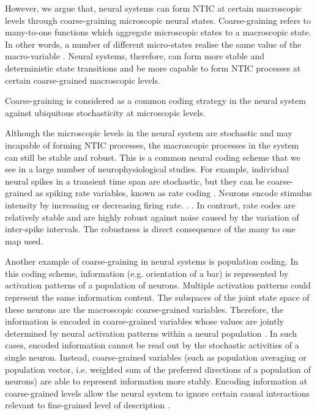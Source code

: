 \documentclass[utf8]{article}
\begin{document}

		However, we argue that, neural systems can form NTIC at certain macroscopic levels through coarse-graining microscopic neural states. Coarse-graining refers to many-to-one functions which aggregate microscopic states to a macroscopic state. In other words, a number of different micro-states realise the same value of the macro-variable \citep{price2007causation}. Neural systems, therefore, can form more stable and deterministic state transitions and be more capable to form NTIC processes at certain coarse-grained macroscopic levels. 
		
		
		Coarse-graining is considered as a common coding strategy in the neural system against ubiquitous stochasticity at microscopic levels.
		
		Although the microscopic levels in the neural system are stochastic and may incapable of forming NTIC processes, the macroscopic processes in the system can still be  stable and robust. This is a common neural coding scheme that we see in a large number of neurophysiological studies. For example, individual neural spikes in a transient time span are stochastic, but they can be coarse-grained as spiking rate variables, known as rate coding \citep{adrian1926impulses, gerstner2002spiking, maass2001pulsed, panzeri2015neural, stein2005neuronal}. Neurons encode stimulus intensity by increasing or decreasing firing rate. \citep{kandel2000principles}.  \citep{stein2005neuronal}. In contrast, rate codes are relatively stable and are highly robust against noise caused by the variation of inter-spike intervals. The robustness is direct consequence of the many to one map used.

		Another example of coarse-graining in neural systems is population coding. In this coding scheme, information (e.g. orientation of a bar) is represented by activation patterns of a population of neurons. Multiple activation patterns could represent the same information content. The subspaces of the joint state space of these neurons are the macroscopic coarse-grained variables. Therefore, the information is encoded in coarse-grained variables whose values are jointly determined by neural activation patterns within a neural population \citep{kristan1997population, pouget2000information, binder2009encyclopedia, QuianQuiroga2009}. In such cases, encoded information cannot be read out by the stochastic activities of a single neuron. Instead, coarse-grained variables (such as population averaging or population vector, i.e. weighted sum of the preferred directions of a population of neurons) are able to represent information more stably. Encoding information at coarse-grained levels allow the neural system to ignore certain causal interactions relevant to fine-grained level of description \citep{Woodward2007-WOOCWA}.
			
\end{document}
